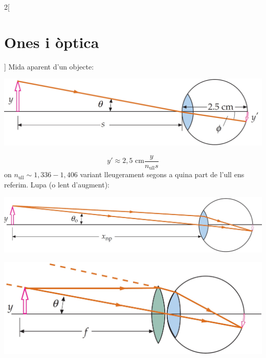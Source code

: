 \documentclass[../../../main.tex]{subfiles}
\begin{document}
\begin{multicols}{2}[\section{Ones i òptica}]
  Mida aparent d'un objecte:\newline
  \begin{minipage}{\linewidth}
    \centering
    \includegraphics[width=\linewidth]{Physics/1st/Waves_and_optics/Images/mida.jpg}
  \end{minipage} $$y'\approx2,5\text{ cm}\frac{y}{n_{\text{ull}}s}$$ {\footnotesize on $n_{\text{ull}}\sim1,336-1,406$ variant lleugerament segons a quina part de l'ull ens referim.}\newline
  Lupa (o lent d'augment):\newline
  \begin{minipage}{\linewidth}
    \includegraphics[width=\linewidth]{Physics/1st/Waves_and_optics/Images/senselup.jpg}
  \end{minipage}
  \begin{minipage}{\linewidth}
    \includegraphics[width=\linewidth]{Physics/1st/Waves_and_optics/Images/lup.jpg}
  \end{minipage}

\end{multicols}
\end{document}
